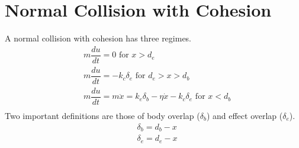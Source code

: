 \documentclass[a4paper,11pt,titlepage]{report}
\begin{document}
\section{Normal Collision with Cohesion}
\label{der:normal collision with cohesion}
A normal collision with cohesion has three regimes.
\begin{align*}
&m\dfrac{du}{dt} = 0 \text{ for } x > d_e \\
&m\dfrac{du}{dt} = - k_c \delta_e \text{ for } d_e > x > d_b \\
&m \dfrac{du}{dt} = m \ddot{x} = k_e \delta_b - \eta \dot{x} - k_c \delta_e \text{ for } x < d_b \\
\end{align*}
Two important definitions are those of body overlap ($\delta_b$) and effect overlap ($\delta_e$).
\begin{align*}
&\delta_b = d_b - x \\
&\delta_e = d_e - x \\
\end{align*}
\end{document}
